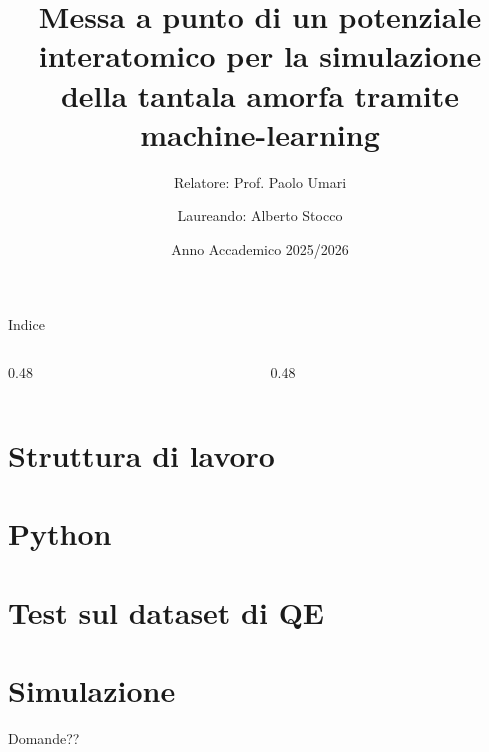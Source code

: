 \documentclass[aspectratio=169, 10pt]{beamer} %
\title[Potenziale interatomico tramite machine-learning]{Messa a punto di un potenziale interatomico per la simulazione della tantala amorfa tramite machine-learning}
\subtitle{}
\author[Alberto Stocco]{Relatore: Prof. Paolo Umari \and Laureando: Alberto Stocco}
\date{Anno Accademico 2025/2026}
\begin{document}
\begin{frame}
    \titlepage    
\end{frame}


\begin{frame}{Indice}
    \begin{columns}[t]
        \begin{column}{0.48\textwidth}
            \tableofcontents[sections={1-2}]
        \end{column}
        \begin{column}{0.48\textwidth}
            \tableofcontents[sections={3-4}]
        \end{column}
    \end{columns}
\end{frame}



\section{Struttura di lavoro}


\section{Python}


\section{Test sul dataset di QE}


\section{Simulazione}




\begin{emptyframe}
    Domande??
\end{emptyframe}
\end{document}
